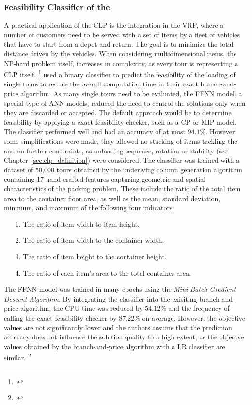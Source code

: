\subsubsection{Feasibility Classifier of the }
A practical application of the \gls{CLP} is the integration in the \gls{VRP}, where
a number of customers need to be served with a set of items by a fleet of vehicles that have
to start from a depot and return. The goal is to minimize the total distance driven
by the vehicles. When considering multidimensional items, the NP-hard problem itself,
increases in complexity, as every tour is representing a \gls{CLP} itself. \footcite[cf.][pp. 1--2]{tamke_branch-and-cut_2024}
\textcite{zhang_learning-based_2022} used a binary classifier to predict the feasibility of the
loading of single tours to reduce the overall computation time in their exact branch-and-price
algorithm. As many single tours need to be evaluated, the \gls{FFNN} model, a special type of \gls{ANN} models, reduced the need
to control the solutions only when they are discarded or accepted. The default approach would be to
determine feasibility by applying a exact feasibility checker, such as a \gls{CP} or \gls{MIP} model.
The classifier performed well and had an accuracy of at most $94.1\%$. However, some simplifications were made,
they allowed no stacking of items tackling the  and no further constraints,
as unloading sequence, rotation or stability (see Chapter~\ref{sec:clp_definition}) were considered.
The classifier was trained with a dataset of 50,000 tours obtained by the underlying column generation
algorithm containing 17 hand-crafted features capturing geometric
and spatial characteristics of the packing problem. These include the ratio of the total item area
to the container floor area, as well as the mean, standard deviation, minimum, and maximum of
the following four indicators:
\begin{itemize}
    \item[1.] The ratio of item width to item height.
    \item[2.] The ratio of item width to the container width.
    \item[3.] The ratio of item height to the container height.
    \item[4.] The ratio of each item’s area to the total container area.
\end{itemize}
The \gls{FFNN} model was trained in many epochs
using the \textit{Mini-Batch Gradient Descent Algorithm}. By integrating the classifier into the
exisiting branch-and-price algorithm, the CPU time was reduced by $54.12\%$ and the frequency of
calling the exact feasibility checker by $87.22\%$ on average. However, the objective values are not significantly
lower and the authors assume that the prediction accuracy does not influence the solution quality
to a high extent, as the objectve values obtained by the branch-and-price algorithm with a \gls{LR} classifier are similar. \footcite[cf.][pp. 4, 9--15]{zhang_learning-based_2022}

